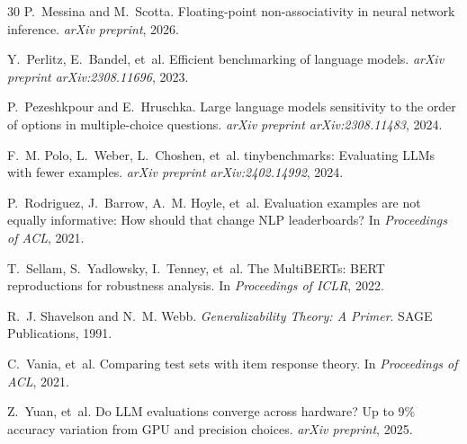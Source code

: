 \documentclass[11pt]{article}
\begin{document}
\begin{thebibliography}{30}
P.~Messina and M.~Scotta.
\newblock Floating-point non-associativity in neural network inference.
\newblock \emph{arXiv preprint}, 2026.

Y.~Perlitz, E.~Bandel, et~al.
\newblock Efficient benchmarking of language models.
\newblock \emph{arXiv preprint arXiv:2308.11696}, 2023.

P.~Pezeshkpour and E.~Hruschka.
\newblock Large language models sensitivity to the order of options in multiple-choice questions.
\newblock \emph{arXiv preprint arXiv:2308.11483}, 2024.

F.~M. Polo, L.~Weber, L.~Choshen, et~al.
\newblock tinybenchmarks: Evaluating LLMs with fewer examples.
\newblock \emph{arXiv preprint arXiv:2402.14992}, 2024.

P.~Rodriguez, J.~Barrow, A.~M. Hoyle, et~al.
\newblock Evaluation examples are not equally informative: How should that change NLP leaderboards?
\newblock In \emph{Proceedings of ACL}, 2021.

T.~Sellam, S.~Yadlowsky, I.~Tenney, et~al.
\newblock The MultiBERTs: BERT reproductions for robustness analysis.
\newblock In \emph{Proceedings of ICLR}, 2022.

R.~J. Shavelson and N.~M. Webb.
\newblock \emph{Generalizability Theory: A Primer}.
\newblock SAGE Publications, 1991.

C.~Vania, et~al.
\newblock Comparing test sets with item response theory.
\newblock In \emph{Proceedings of ACL}, 2021.

Z.~Yuan, et~al.
\newblock Do LLM evaluations converge across hardware? Up to 9\% accuracy variation from GPU and precision choices.
\newblock \emph{arXiv preprint}, 2025.

\end{thebibliography}
\end{document}
